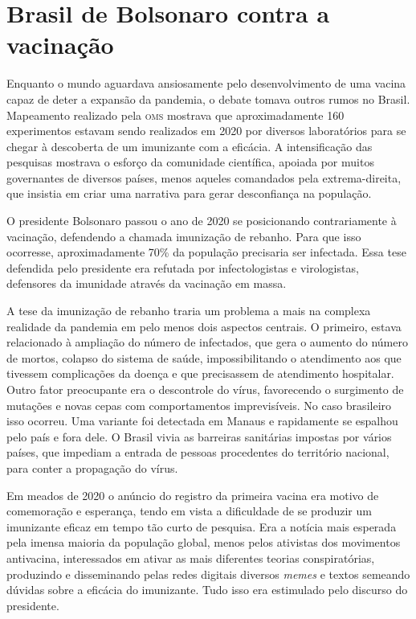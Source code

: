 \section{Brasil de Bolsonaro contra a vacinação}

Enquanto o mundo aguardava ansiosamente pelo desenvolvimento de uma
vacina capaz de deter a expansão da pandemia, o debate tomava outros
rumos no Brasil. Mapeamento realizado pela \textsc{oms} mostrava que
aproximadamente 160 experimentos estavam sendo realizados em 2020 por
diversos laboratórios para se chegar à descoberta de um imunizante com a
eficácia. A intensificação das pesquisas mostrava o esforço da
comunidade científica, apoiada por muitos governantes de diversos
países, menos aqueles comandados pela extrema-direita, que insistia em
criar uma narrativa para gerar desconfiança na população.

O presidente Bolsonaro passou o ano de 2020 se posicionando
contrariamente à vacinação, defendendo a chamada imunização de rebanho.
Para que isso ocorresse, aproximadamente 70\% da população precisaria
ser infectada. Essa tese defendida pelo presidente era refutada por
infectologistas e virologistas, defensores da imunidade através da
vacinação em massa.

A tese da imunização de rebanho traria um problema a mais na complexa
realidade da pandemia em pelo menos dois aspectos centrais. O primeiro,
estava relacionado à ampliação do número de infectados, que gera o
aumento do número de mortos, colapso do sistema de saúde,
impossibilitando o atendimento aos que tivessem complicações da doença e
que precisassem de atendimento hospitalar. Outro fator preocupante era o
descontrole do vírus, favorecendo o surgimento de mutações e novas cepas
com comportamentos imprevisíveis. No caso brasileiro isso ocorreu. Uma
variante foi detectada em Manaus e rapidamente se espalhou pelo país e
fora dele. O Brasil vivia as barreiras sanitárias impostas por vários
países, que impediam a entrada de pessoas procedentes do território
nacional, para conter a propagação do vírus.

Em meados de 2020 o anúncio do registro da primeira vacina era motivo de
comemoração e esperança, tendo em vista a dificuldade de se produzir um
imunizante eficaz em tempo tão curto de pesquisa. Era a notícia mais
esperada pela imensa maioria da população global, menos pelos ativistas
dos movimentos antivacina, interessados em ativar as mais diferentes
teorias conspiratórias, produzindo e disseminando pelas redes digitais
diversos \textit{memes} e textos semeando dúvidas sobre a eficácia do imunizante.
Tudo isso era estimulado pelo discurso do presidente.

